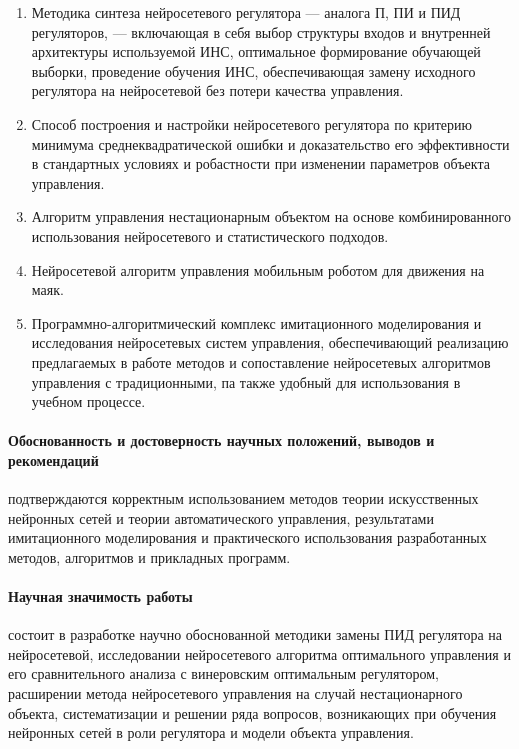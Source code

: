 \begin{enumerate}
\item 
Методика синтеза нейросетевого регулятора --- аналога П, ПИ и ПИД
регуляторов, --- включающая в себя выбор структуры входов и внутренней
архитектуры используемой ИНС, оптимальное формирование обучающей
выборки, проведение обучения ИНС, обеспечивающая замену исходного
регулятора на нейросетевой без потери качества управления.

\item
Способ построения и настройки нейросетевого регулятора по критерию
минимума среднеквадратической ошибки и доказательство его
эффективности в стандартных условиях и робастности при изменении
параметров объекта управления.

\item
Алгоритм управления нестационарным объектом на основе комбинированного
использования нейросетевого и статистического подходов.

\item
Нейросетевой алгоритм управления мобильным роботом для движения на маяк.

\item
Программно-алгоритмический комплекс имитационного моделирования и
исследования нейросетевых систем управления, обеспечивающий реализацию
предлагаемых в работе методов и сопоставление нейросетевых алгоритмов
управления с традиционными, па также удобный для использования в
учебном процессе.
\end{enumerate}


\paragraph{Обоснованность и достоверность научных положений, выводов
и рекомендаций} подтверждаются корректным использованием методов
теории искусственных нейронных сетей и теории автоматического
управления, результатами имитационного моделирования и практического
использования разработанных методов, алгоритмов и прикладных программ.

\paragraph{Научная значимость работы} состоит в разработке научно
обоснованной методики замены ПИД регулятора на нейросетевой,
исследовании нейросетевого алгоритма оптимального управления и его
сравнительного анализа с винеровским оптимальным регулятором,
расширении метода нейросетевого управления на случай нестационарного
объекта, систематизации и решении ряда вопросов, возникающих при
обучения нейронных сетей в роли регулятора и модели объекта
управления.

